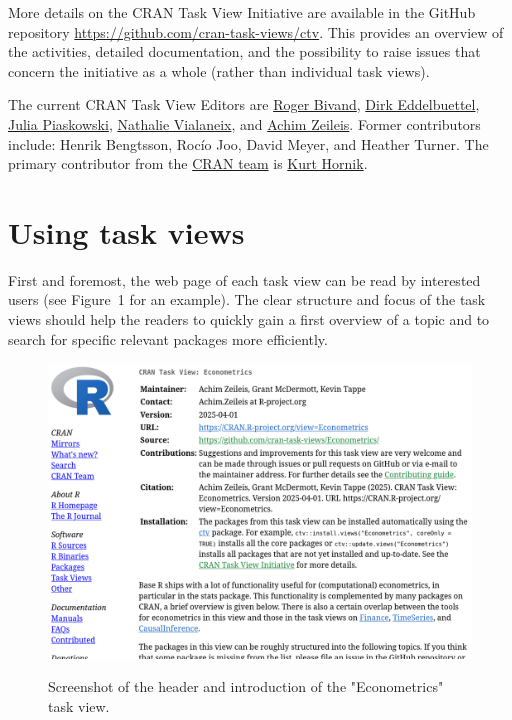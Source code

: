 More details on the CRAN Task View Initiative are available in the GitHub repository
\url{https://github.com/cran-task-views/ctv}. This provides an overview of the activities,
detailed documentation, and the possibility to raise issues that concern the initiative
as a whole (rather than individual task views).

The current CRAN Task View Editors are
\href{https://github.com/rsbivand}{Roger Bivand},
\href{https://github.com/eddelbuettel}{Dirk Eddelbuettel},
\href{https://github.com/jpiaskowski}{Julia Piaskowski},
\href{https://github.com/tuxette}{Nathalie Vialaneix}, and
\href{https://github.com/zeileis}{Achim Zeileis}.
Former contributors include: Henrik Bengtsson, Rocío Joo, David Meyer, and Heather Turner.
The primary contributor from the \href{https://CRAN.R-project.org/CRAN_team.htm}{CRAN team} is
\href{https://github.com/kurthornik}{Kurt Hornik}.

\section{Using task views}\label{using-task-views}

First and foremost, the web page of each task view can be read by interested users
(see Figure~1 for an example).
The clear structure and focus of the task views should help the readers to quickly
gain a first overview of a topic and to search for specific relevant packages
more efficiently.

\begin{figure}[t!]
\includegraphics[width=1\linewidth,alt={Screenshot of the header and introduction of the Econometrics task view, captured on 2025-04-01 at https://CRAN.R-project.org/view=Econometrics. The header displays the title (Econometrics), maintainers (Achim Zeileis, Grant McDermott, Kevin Tappe), contact e-mail address, version/date, URL, GitHub link, information for potential contributors, the recommended citation, and installation instructions. The introduction starts by outlining the scope and links to other related task views (Finance, TimeSeries, CausalInference).}]{figures/econometrics} \caption{Screenshot of the header and introduction of the "Econometrics" task view.}\label{fig:econometrics}
\end{figure}

